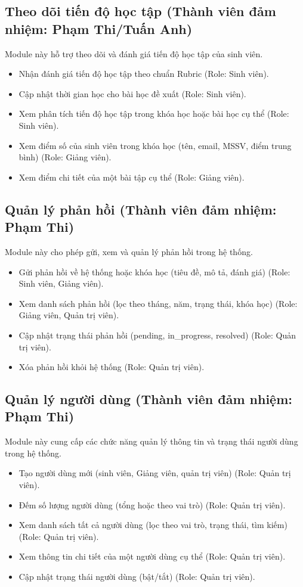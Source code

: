 \subsection{Theo dõi tiến độ học tập (Thành viên đảm nhiệm: Phạm Thi/Tuấn Anh)}
Module này hỗ trợ theo dõi và đánh giá tiến độ học tập của sinh viên.
\begin{itemize}[label=--]
    \item Nhận đánh giá tiến độ học tập theo chuẩn Rubric (Role: Sinh viên).
    \item Cập nhật thời gian học cho bài học đề xuất (Role: Sinh viên).
    \item Xem phân tích tiến độ học tập trong khóa học hoặc bài học cụ thể (Role: Sinh viên).
    \item Xem điểm số của sinh viên trong khóa học (tên, email, MSSV, điểm trung bình) (Role: Giảng viên).
    \item Xem điểm chi tiết của một bài tập cụ thể (Role: Giảng viên).
\end{itemize}

\subsection{Quản lý phản hồi (Thành viên đảm nhiệm: Phạm Thi)}
Module này cho phép gửi, xem và quản lý phản hồi trong hệ thống.
\begin{itemize}[label=--]
    \item Gửi phản hồi về hệ thống hoặc khóa học (tiêu đề, mô tả, đánh giá) (Role: Sinh viên, Giảng viên).
    \item Xem danh sách phản hồi (lọc theo tháng, năm, trạng thái, khóa học) (Role: Giảng viên, Quản trị viên).
    \item Cập nhật trạng thái phản hồi (pending, in\_progress, resolved) (Role: Quản trị viên).
    \item Xóa phản hồi khỏi hệ thống (Role: Quản trị viên).
\end{itemize}

\subsection{Quản lý người dùng (Thành viên đảm nhiệm: Phạm Thi)}
Module này cung cấp các chức năng quản lý thông tin và trạng thái người dùng trong hệ thống.
\begin{itemize}[label=--]
    \item Tạo người dùng mới (sinh viên, Giảng viên, quản trị viên) (Role: Quản trị viên).
    \item Đếm số lượng người dùng (tổng hoặc theo vai trò) (Role: Quản trị viên).
    \item Xem danh sách tất cả người dùng (lọc theo vai trò, trạng thái, tìm kiếm) (Role: Quản trị viên).
    \item Xem thông tin chi tiết của một người dùng cụ thể (Role: Quản trị viên).
    \item Cập nhật trạng thái người dùng (bật/tắt) (Role: Quản trị viên).
\end{itemize}

